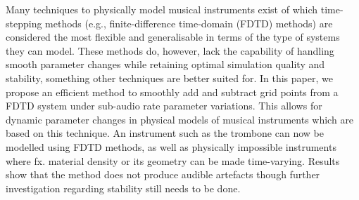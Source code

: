 Many techniques to physically model musical instruments exist of which time-stepping methods (e.g., finite-difference time-domain (FDTD) methods) are considered the most flexible and generalisable in terms of the type of systems they can model. These methods do, however, lack the capability of handling smooth parameter changes %
while retaining optimal simulation quality and stability, something other techniques are better suited for.   In this paper, we propose an efficient method to smoothly add and subtract grid points from a FDTD system under sub-audio rate parameter variations. This allows for dynamic parameter changes in physical models of musical instruments which are based on this technique. An instrument such as the trombone can now be modelled using FDTD methods, as well as physically impossible instruments where fx. material density or its geometry can be made time-varying. Results show that the method does not produce audible artefacts though further investigation regarding stability still needs to be done.

